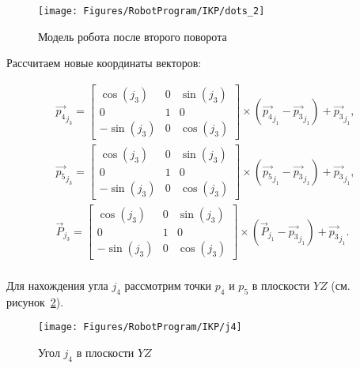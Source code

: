 \begin{figure}[H]
    \centering
    \vspace{14pt}
    \texttt{[image: Figures/RobotProgram/IKP/dots\_2]}
    \caption{Модель робота после второго поворота}
    \label{fig:RobotProgram:IKP:dots_2}
\end{figure}

Рассчитаем новые координаты векторов:

\begin{gather*}
    \overrightarrow{p_4}_{j_3} =
    \begin{bmatrix}
        \cos(j_3)  & 0 & \sin(j_3) \\
        0          & 1 & 0         \\
        -\sin(j_3) & 0 & \cos(j_3)
    \end{bmatrix} \times \left( \overrightarrow{p_4}_{j_1} - \overrightarrow{p_3}_{j_1} \right) + \overrightarrow{p_3}_{j_1}, \\
    \overrightarrow{p_5}_{j_3} =
    \begin{bmatrix}
        \cos(j_3)  & 0 & \sin(j_3) \\
        0          & 1 & 0         \\
        -\sin(j_3) & 0 & \cos(j_3)
    \end{bmatrix} \times \left( \overrightarrow{p_5}_{j_1} - \overrightarrow{p_3}_{j_1} \right) + \overrightarrow{p_3}_{j_1}, \\
    \overrightarrow{P}_{j_3} =
    \begin{bmatrix}
        \cos(j_3)  & 0 & \sin(j_3) \\
        0          & 1 & 0         \\
        -\sin(j_3) & 0 & \cos(j_3)
    \end{bmatrix} \times \left( \overrightarrow{P}_{j_1} - \overrightarrow{p_3}_{j_1} \right) + \overrightarrow{p_3}_{j_1}.
\end{gather*} \\

Для нахождения угла $j_4$ рассмотрим точки $p_4$ и $p_5$ в плоскости $YZ$ (см. рисунок~\ref{fig:RobotProgram:IKP:j4}).

\begin{figure}[H]
    \centering
    \vspace{14pt}
    \texttt{[image: Figures/RobotProgram/IKP/j4]}
    \caption{Угол $j_4$ в плоскости $YZ$}
    \label{fig:RobotProgram:IKP:j4}
\end{figure}


